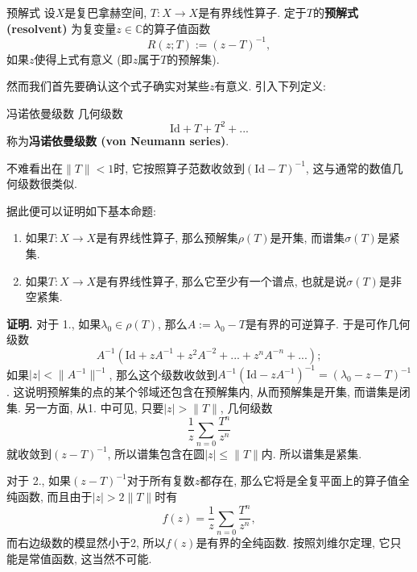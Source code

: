 

\begin{definition}{预解式}
设$X$是复巴拿赫空间, $T:X\to X$是有界线性算子. 定于$T$的\textbf{预解式 (resolvent)} 为复变量$z\in\mathbb{C}$的算子值函数
$$
R(z;T):=(z-T)^{-1},
$$
如果$z$使得上式有意义 (即$z$属于$T$的预解集).
\end{definition}

然而我们首先要确认这个式子确实对某些$z$有意义. 引入下列定义:

\begin{definition}{冯诺依曼级数}
几何级数
$$
\text{Id}+T+T^2+...
$$
称为\textbf{冯诺依曼级数 (von Neumann series)}.
\end{definition}
不难看出在$\|T\|<1$时, 它按照算子范数收敛到$(\text{Id}-T)^{-1}$, 这与通常的数值几何级数很类似.

据此便可以证明如下基本命题:

\begin{theorem}{}
\begin{enumerate}
\item 如果$T:X\to X$是有界线性算子, 那么预解集$\rho(T)$是开集, 而谱集$\sigma(T)$是紧集.
\item 如果$T:X\to X$是有界线性算子, 那么它至少有一个谱点, 也就是说$\sigma(T)$是非空紧集.
\end{enumerate}
\end{theorem}
\textbf{证明.} 
对于 1., 如果$\lambda_0\in\rho(T)$, 那么$A:=\lambda_0-T$是有界的可逆算子. 于是可作几何级数
$$
A^{-1}(\text{Id}+zA^{-1}+z^2A^{-2}+...+z^nA^{-n}+...);
$$
如果$|z|<\|A^{-1}\|^{-1}$, 那么这个级数收敛到$A^{-1}(\text{Id}-zA^{-1})^{-1}=(\lambda_0-z-T)^{-1}$. 这说明预解集的点的某个邻域还包含在预解集内, 从而预解集是开集, 而谱集是闭集. 另一方面, 从1. 中可见, 只要$|z|>\|T\|$, 几何级数
$$
\frac{1}{z}\sum_{n=0}\frac{T^n}{z^n}
$$
就收敛到$(z-T)^{-1}$, 所以谱集包含在圆$|z|\leq\|T\|$内. 所以谱集是紧集.

对于 2., 如果$(z-T)^{-1}$对于所有复数$z$都存在, 那么它将是全复平面上的算子值全纯函数, 而且由于$|z|>2\|T\|$时有
$$
f(z)=\frac{1}{z}\sum_{n=0}\frac{T^n}{z^n},
$$
而右边级数的模显然小于2, 所以$f(z)$是有界的全纯函数. 按照刘维尔定理, 它只能是常值函数, 这当然不可能.